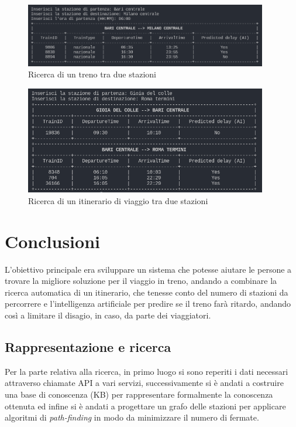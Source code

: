 \documentclass[italian,12pt,a4paper]{article}
\begin{document}
		\begin{figure}[!h]
			\centering
			\includegraphics[width=400px]{img/search_train}
			\caption{Ricerca di un treno tra due stazioni}
		\end{figure}

		\begin{figure}[!h]
			\centering
			\includegraphics[width=400px]{img/search_itin}
			\caption{Ricerca di un itinerario di viaggio tra due stazioni}
		\end{figure}
		
	\section{Conclusioni}
		L'obiettivo principale era sviluppare un sistema che potesse aiutare le persone a trovare la migliore soluzione per il viaggio in treno, andando a combinare la ricerca automatica di un itinerario, che tenesse conto del numero di stazioni da percorrere e l'intelligenza artificiale per predire se il treno farà ritardo, andando così a limitare il disagio, in caso, da parte dei viaggiatori.
		
		\subsection{Rappresentazione e ricerca}
			Per la parte relativa alla ricerca, in primo luogo si sono reperiti i dati necessari attraverso chiamate API a vari servizi, successivamente si è andati a costruire una base di conoscenza (KB) per rappresentare formalmente la conoscenza ottenuta ed infine si è andati a progettare un grafo delle stazioni per applicare algoritmi di \textit{path-finding} in modo da minimizzare il numero di fermate.
		
\end{document}
